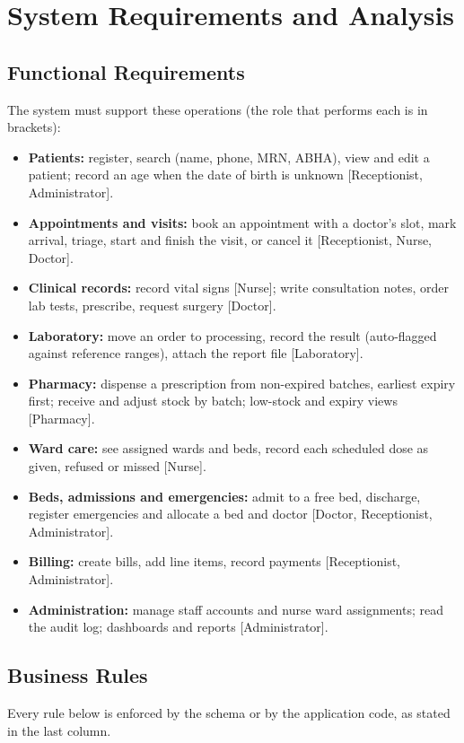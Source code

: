 \chapter{System Requirements and Analysis}

\section{Functional Requirements}
The system must support these operations (the role that performs each is in brackets):
\begin{itemize}
\item \textbf{Patients:} register, search (name, phone, MRN, ABHA), view and edit a patient; record an age when the date of birth is unknown [Receptionist, Administrator].
\item \textbf{Appointments and visits:} book an appointment with a doctor's slot, mark arrival, triage, start and finish the visit, or cancel it [Receptionist, Nurse, Doctor].
\item \textbf{Clinical records:} record vital signs [Nurse]; write consultation notes, order lab tests, prescribe, request surgery [Doctor].
\item \textbf{Laboratory:} move an order to processing, record the result (auto-flagged against reference ranges), attach the report file [Laboratory].
\item \textbf{Pharmacy:} dispense a prescription from non-expired batches, earliest expiry first; receive and adjust stock by batch; low-stock and expiry views [Pharmacy].
\item \textbf{Ward care:} see assigned wards and beds, record each scheduled dose as given, refused or missed [Nurse].
\item \textbf{Beds, admissions and emergencies:} admit to a free bed, discharge, register emergencies and allocate a bed and doctor [Doctor, Receptionist, Administrator].
\item \textbf{Billing:} create bills, add line items, record payments [Receptionist, Administrator].
\item \textbf{Administration:} manage staff accounts and nurse ward assignments; read the audit log; dashboards and reports [Administrator].
\end{itemize}

\section{Business Rules}
Every rule below is enforced by the schema or by the application code, as stated in the last column.


